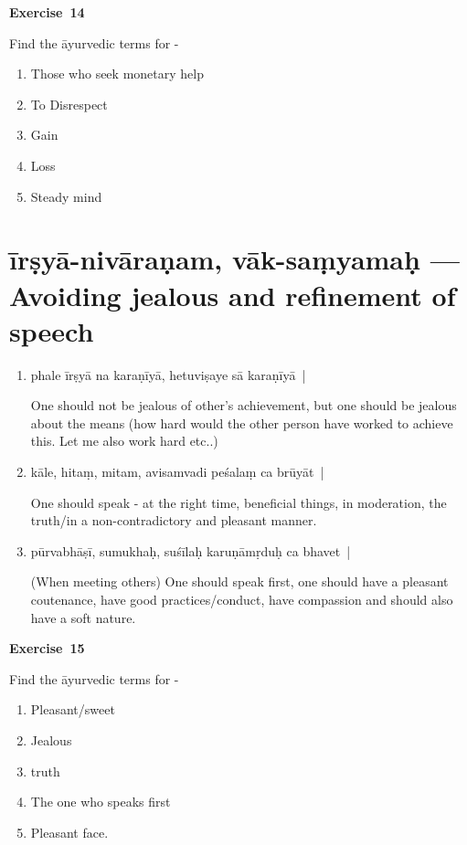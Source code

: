 \centerline{\textbf{Exercise~14}}

Find the āyurvedic terms for -

\begin{enumerate}
\itemsep=0pt
\renewcommand{\theenumi}{\alph{enumi}}
\renewcommand{\labelenumi}{\theenumi.}
\item Those who seek monetary help
\item To Disrespect
\item Gain
\item Loss
\item Steady mind
\end{enumerate}

\chapter{īrṣyā-nivāraṇam, vāk-saṃyamaḥ --- Avoiding jealous and refinement of speech}

\begin{enumerate}
\itemsep=0pt
\item {}

phale īrṣyā na karaṇīyā, hetuviṣaye sā karaṇīyā~| 

One should not be jealous of other’s achievement, but one should be jealous about the means (how hard would the other person have worked to achieve this. Let me also work hard etc..)

\item {}

kāle, hitaṃ, mitam, avisamvadi peśalaṃ ca brūyāt~|

One should speak - at the right time, beneficial things, in moderation, the truth/in a non-contradictory and pleasant manner. 

\item {}

pūrvabhāṣī, sumukhaḥ, suśīlaḥ karuṇāmṛduḥ ca bhavet~|  

(When meeting others) One should speak first, one should have a pleasant coutenance, have good practices/conduct, have compassion and should also have a soft nature.
\end{enumerate}

\centerline{\textbf{Exercise~15}}

Find the āyurvedic terms for -

\begin{enumerate}
\itemsep=0pt
\renewcommand{\theenumi}{\alph{enumi}}
\renewcommand{\labelenumi}{\theenumi.}
\item Pleasant/sweet
\item Jealous
\item truth
\item The one who speaks first
\item Pleasant face.
\end{enumerate}

